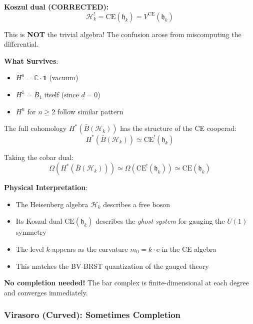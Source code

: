 \begin{example}
\textbf{Koszul dual (CORRECTED):}
$$\mathcal{H}_k^! = \text{CE}(\mathfrak{h}_k) = V^{\text{CE}}(\mathfrak{h}_k)$$

This is \textbf{NOT} the trivial algebra! The confusion arose from miscomputing the differential.

\textbf{What Survives}:
\begin{itemize}
\item $H^0 = \mathbb{C} \cdot \mathbf{1}$ (vacuum)
\item $H^1 = \bar{B}_1$ itself (since $d = 0$)
\item $H^n$ for $n \geq 2$ follow similar pattern
\end{itemize}

The full cohomology $H^*(\bar{B}(\mathcal{H}_k))$ has the structure of the CE cooperad:
$$H^*(\bar{B}(\mathcal{H}_k)) \simeq \text{CE}^!(\mathfrak{h}_k)$$

Taking the cobar dual:
$$\Omega(H^*(\bar{B}(\mathcal{H}_k))) \simeq \Omega(\text{CE}^!(\mathfrak{h}_k)) \simeq \text{CE}(\mathfrak{h}_k)$$

\textbf{Physical Interpretation}:
\begin{itemize}
\item The Heisenberg algebra $\mathcal{H}_k$ describes a free boson
\item Its Koszul dual $\text{CE}(\mathfrak{h}_k)$ describes the \emph{ghost system} for gauging the $U(1)$ symmetry
\item The level $k$ appears as the curvature $m_0 = k \cdot c$ in the CE algebra
\item This matches the BV-BRST quantization of the gauged theory
\end{itemize}

\textbf{No completion needed!} The bar complex is finite-dimensional at each degree and 
converges immediately.
\end{example}

\subsubsection{Virasoro (Curved): Sometimes Completion}

